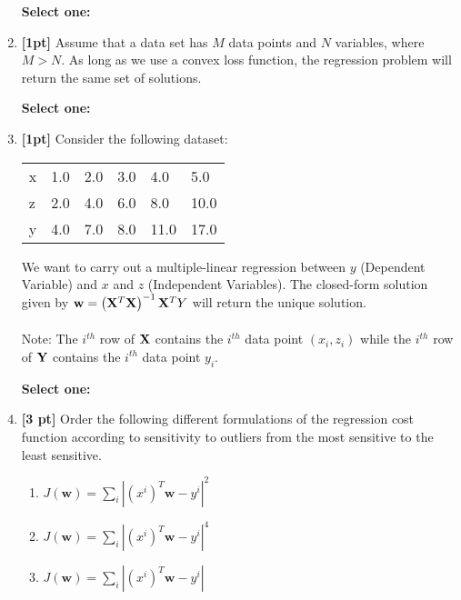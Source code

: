 \begin{enumerate}
    \textbf{Select one:}
    
    
    \item \textbf{[1pt]} Assume that a data set has $M$ data points and $N$ variables, where $M>N$. As long as we use a convex loss function, the regression problem will return the same set of solutions.
    
    \textbf{Select one:}
    
    
    \newpage
    \item \textbf{[1pt]} Consider the following dataset:
        \begin{table}[H]
    \centering
        \begin{tabular}{llllll}
        x & 1.0 & 2.0 & 3.0 & 4.0 & 5.0 \\
        z & 2.0 & 4.0 & 6.0 & 8.0 & 10.0 \\
        y & 4.0 & 7.0 & 8.0 & 11.0 & 17.0
        \end{tabular}
    \end{table}
   We want to carry out a multiple-linear regression between $y$ (Dependent Variable) and $x$ and $z$ (Independent Variables). The closed-form solution given by $\mathbf{w} = \left(\mathbf{X}^T\mathbf{X}\right)^{-1}\mathbf{X}^T Y$ will return the unique solution. 
    \\~\\
    Note: The $i^{th}$ row of $\mathbf{X}$ contains the $i^{th}$ data point $(x_i,z_i)$ while the $i^{th}$ row of $\mathbf{Y}$ contains the $i^{th}$ data point $y_i$. 
    
        \textbf{Select one:}
    

    
    \item \textbf{[3 pt]} Order the following different formulations of the regression cost function according to sensitivity to outliers from the most sensitive to the least sensitive. 
\begin{enumerate}
    \item $J(\mathbf{w}) = \sum\limits_{i} | (x^i)^T\mathbf{w}-y^i|^2$
    \item $J(\mathbf{w}) = \sum\limits_{i} | (x^i)^T\mathbf{w}-y^i|^4$
    \item $J(\mathbf{w}) = \sum\limits_{i} | (x^i)^T\mathbf{w}-y^i|$
\end{enumerate}


\end{enumerate}
